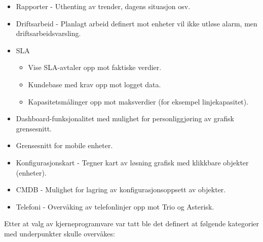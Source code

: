 \begin{itemize}
	\item Rapporter - Uthenting av trender, dagens situasjon osv.
	\item Driftsarbeid - Planlagt arbeid definert mot enheter vil ikke utløse alarm, men driftsarbeidsvarsling.
	\item SLA
	\begin{itemize}
		\item Vise SLA-avtaler opp mot faktiske verdier.
		\item Kundebase med krav opp mot logget data.
		\item Kapasitetsmålinger opp mot maksverdier (for eksempel linjekapasitet).
	\end{itemize}
	\item Dashboard-funksjonalitet med mulighet for personliggjøring av grafisk grensesnitt.
	\item Grensesnitt for mobile enheter.
	\item Konfigurasjonskart - Tegner kart av løsning grafisk med klikkbare objekter (enheter).
	\item CMDB - Mulighet for lagring av konfigurasjonsoppsett av objekter.
	\item Telefoni - Overvåking av telefonlinjer opp mot Trio og Asterisk.
\end{itemize}

Etter at valg av kjerneprogramvare var tatt ble det definert at følgende kategorier med underpunkter skulle overvåkes:

